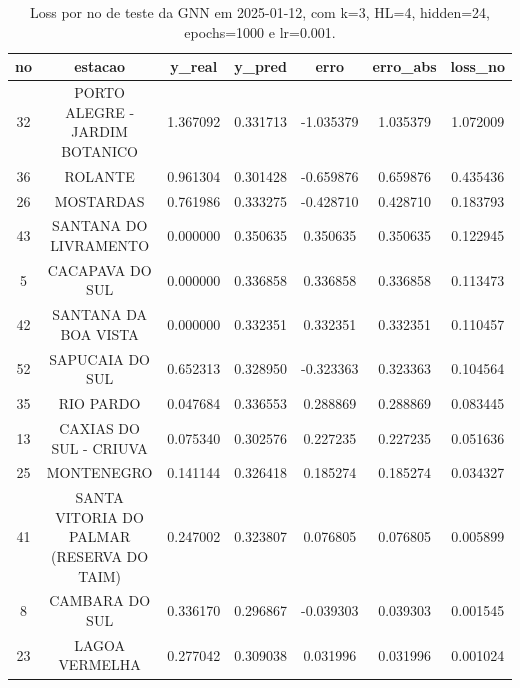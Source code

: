 \begin{table}[h]
\centering
\caption{Loss por no de teste da GNN em 2025-01-12, com k=3, HL=4, hidden=24, epochs=1000 e lr=0.001.}
\label{tab:gnn_loss_k3_hl4_h24_e1000_d20250112}
\begin{tabular}{ccccccc}
\toprule
no & estacao & y\_real & y\_pred & erro & erro\_abs & loss\_no \\
\midrule
32 & PORTO ALEGRE - JARDIM BOTANICO & 1.367092 & 0.331713 & -1.035379 & 1.035379 & 1.072009 \\
36 & ROLANTE & 0.961304 & 0.301428 & -0.659876 & 0.659876 & 0.435436 \\
26 & MOSTARDAS & 0.761986 & 0.333275 & -0.428710 & 0.428710 & 0.183793 \\
43 & SANTANA DO LIVRAMENTO & 0.000000 & 0.350635 & 0.350635 & 0.350635 & 0.122945 \\
5 & CACAPAVA DO SUL & 0.000000 & 0.336858 & 0.336858 & 0.336858 & 0.113473 \\
42 & SANTANA DA BOA VISTA & 0.000000 & 0.332351 & 0.332351 & 0.332351 & 0.110457 \\
52 & SAPUCAIA DO SUL & 0.652313 & 0.328950 & -0.323363 & 0.323363 & 0.104564 \\
35 & RIO PARDO & 0.047684 & 0.336553 & 0.288869 & 0.288869 & 0.083445 \\
13 & CAXIAS DO SUL - CRIUVA & 0.075340 & 0.302576 & 0.227235 & 0.227235 & 0.051636 \\
25 & MONTENEGRO & 0.141144 & 0.326418 & 0.185274 & 0.185274 & 0.034327 \\
41 & SANTA VITORIA DO PALMAR (RESERVA DO TAIM) & 0.247002 & 0.323807 & 0.076805 & 0.076805 & 0.005899 \\
8 & CAMBARA DO SUL & 0.336170 & 0.296867 & -0.039303 & 0.039303 & 0.001545 \\
23 & LAGOA VERMELHA & 0.277042 & 0.309038 & 0.031996 & 0.031996 & 0.001024 \\
\bottomrule
\end{tabular}
\end{table}
